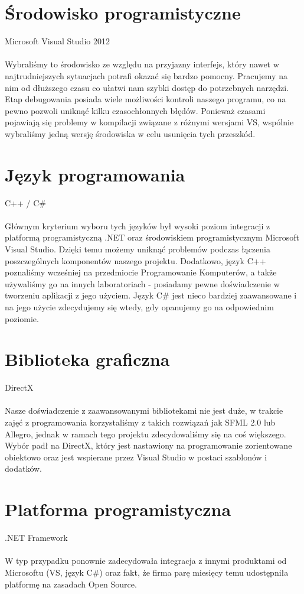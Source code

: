 \documentclass[a4paper,twoside]{article}
\begin{document}
\section{Środowisko programistyczne}

{\Large Microsoft Visual Studio 2012} \\\\
Wybraliśmy to środowisko ze względu na przyjazny interfejs, który nawet w najtrudniejszych sytuacjach potrafi okazać się bardzo pomocny. Pracujemy na nim od dłuższego czasu co ułatwi nam szybki dostęp do potrzebnych narzędzi. Etap debugowania posiada wiele możliwości kontroli naszego programu, co na pewno pozwoli uniknąć kilku czasochłonnych błędów. Ponieważ czasami pojawiają się problemy w kompilacji związane z różnymi wersjami VS, wspólnie wybraliśmy jedną wersję środowiska w celu usunięcia tych przeszkód.

\section{Język programowania}

{\Large C++ / C\#} \\\\
Głównym kryterium wyboru tych języków był wysoki poziom integracji z platformą programistyczną .NET oraz środowiskiem programistycznym Microsoft Visual Studio. Dzięki temu możemy uniknąć problemów podczas łączenia poszczególnych komponentów naszego projektu. Dodatkowo, język C++ poznaliśmy wcześniej na przedmiocie Programowanie Komputerów, a także używaliśmy go na innych laboratoriach - posiadamy pewne doświadczenie w tworzeniu aplikacji z jego użyciem. Język C\# jest nieco bardziej zaawansowane i na jego użycie zdecydujemy się wtedy, gdy opanujemy go na odpowiednim poziomie.

\section{Biblioteka graficzna}
{\Large DirectX} \\\\
Nasze doświadczenie z zaawansowanymi bibliotekami nie jest duże, w trakcie zajęć z programowania korzystaliśmy z takich rozwiązań jak SFML 2.0 lub Allegro, jednak w ramach tego projektu zdecydowaliśmy się na coś większego. Wybór padł na DirectX, który jest nastawiony na programowanie zorientowane obiektowo oraz jest wspierane przez Visual Studio w postaci szablonów i dodatków.

\section{Platforma programistyczna}
{\Large .NET Framework} \\\\
W typ przypadku ponownie zadecydowała integracja z innymi produktami od Microsoftu (VS, język C\#) oraz fakt, że firma parę miesięcy temu udostępniła platformę na zasadach Open Source.
\end{document}
